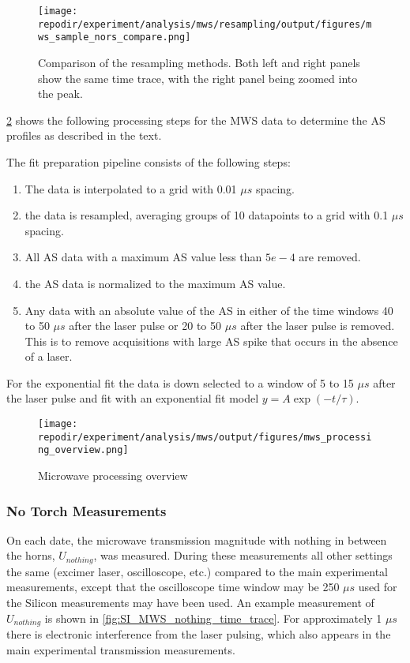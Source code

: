 \begin{figure}
\centering
\texttt{[image: \\repodir/experiment/analysis/mws/resampling/output/figures/mws\_sample\_nors\_compare.png]}
\caption{Comparison of the resampling methods. Both left and right panels show the same time trace, with the right panel being zoomed into the peak.}
\label{fig:SI_mws_resampling}
\end{figure}

\ref{fig:SI_mws_processing_overview} shows the following processing steps for the MWS data to determine the AS profiles as described in the text.

The fit preparation pipeline consists of the following steps:

\begin{enumerate}
    \item The data is interpolated to a grid with 0.01 $\mu s$ spacing.
    \item the data is resampled, averaging groups of 10 datapoints to a grid with 0.1 $\mu s$ spacing.
    \item  All AS data with a maximum AS value less than $5e-4$ are removed.
    \item the AS data is normalized to the maximum AS value.
    \item Any data with an absolute value of the AS in either of the time windows 40 to 50 $\mu s$ after the laser pulse or 20 to 50 $\mu s$ after the laser pulse is removed. This is to remove acquisitions with large AS spike that occurs in the absence of a laser. 
\end{enumerate}


For the exponential fit the data is down selected to a window of 5 to 15 $\mu s$ after the laser pulse and fit with an exponential fit model $y = A \exp(-t/\tau) $.


\begin{figure}[]
\centering
\texttt{[image: \\repodir/experiment/analysis/mws/output/figures/mws\_processing\_overview.png]}
\caption{Microwave processing overview}
\label{fig:SI_mws_processing_overview}
\end{figure}


\subsubsection{No Torch Measurements}

On each date, the microwave transmission magnitude with nothing in between the horns, $U_{nothing}$, was measured. During these measurements all other settings the same (excimer laser, oscilloscope, etc.) compared to the main experimental measurements, except that the oscilloscope time window may be 250 $\mu s$ used for the Silicon measurements may have been used. An example measurement of $U_{nothing}$ is shown in \ref{fig:SI_MWS_nothing_time_trace}. For approximately 1 $\mu s$ there is electronic interference from the laser pulsing, which also appears in the main experimental transmission measurements. 



